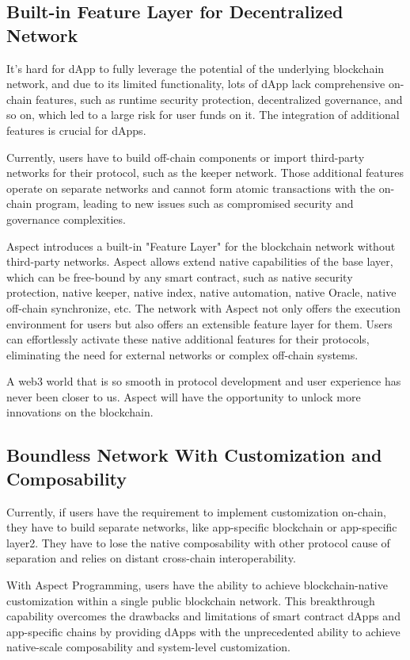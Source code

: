 \subsection{Built-in Feature Layer for Decentralized Network}

It's hard for dApp to fully leverage the potential of the underlying blockchain network, and due to its limited functionality, lots of dApp lack comprehensive on-chain features, such as runtime security protection, decentralized governance, and so on, which led to a large risk for user funds on it. The integration of additional features is crucial for dApps.

Currently, users have to build off-chain components or import third-party networks for their protocol, such as the keeper network. Those additional features operate on separate networks and cannot form atomic transactions with the on-chain program, leading to new issues such as compromised security and governance complexities.

Aspect introduces a built-in "Feature Layer" for the blockchain network without third-party networks. Aspect allows extend native capabilities of the base layer, which can be free-bound by any smart contract, such as native security protection, native keeper, native index, native automation, native Oracle, native off-chain synchronize, etc. The network with Aspect not only offers the execution environment for users but also offers an extensible feature layer for them. Users can effortlessly activate these native additional features for their protocols, eliminating the need for external networks or complex off-chain systems.

A web3 world that is so smooth in protocol development and user experience has never been closer to us. Aspect will have the opportunity to unlock more innovations on the blockchain.

\subsection{Boundless Network With Customization and Composability}

Currently, if users have the requirement to implement customization on-chain, they have to build separate networks, like app-specific blockchain or app-specific layer2. They have to lose the native composability with other protocol cause of separation and relies on distant cross-chain interoperability.

With Aspect Programming, users have the ability to achieve blockchain-native customization within a single public blockchain network. This breakthrough capability overcomes the drawbacks and limitations of smart contract dApps and app-specific chains by providing dApps with the unprecedented ability to achieve native-scale composability and system-level customization.

